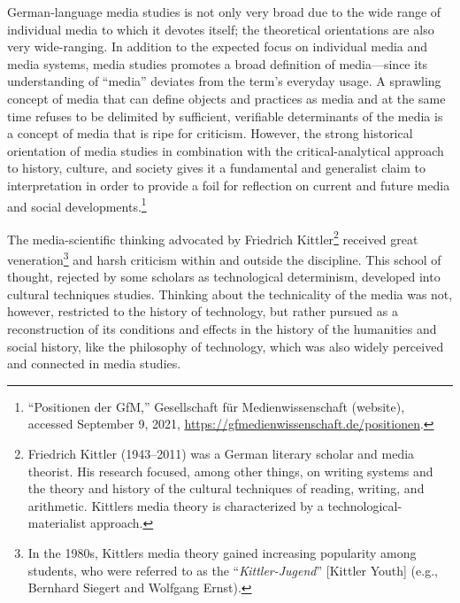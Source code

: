 \documentclass{tufte-handout}
\begin{document}
German-language media studies is not only very broad due to the wide
range of individual media to which it devotes itself; the theoretical
orientations are also very wide-ranging. In addition to the expected
focus on individual media and media systems, media studies promotes a
broad definition of media---since its understanding of ``media''
deviates from the term's everyday usage. A sprawling concept of media
that can define objects and practices as media and at the same time
refuses to be delimited by sufficient, verifiable determinants of the
media is a concept of media that is ripe for criticism. However, the
strong historical orientation of media studies in combination with the
critical-analytical approach to history, culture, and society gives it a
fundamental and generalist claim to interpretation in order to provide a
foil for reflection on current and future media and social
developments.\footnote{``Positionen der GfM,'' Gesellschaft für
  Medienwissenschaft (website), accessed September 9, 2021,
  \url{https://gfmedienwissenschaft.de/positionen}.}

The media-scientific thinking advocated by Friedrich Kittler\footnote{Friedrich
  Kittler (1943--2011) was a German literary scholar and media theorist.
  His research focused, among other things, on writing systems and the
  theory and history of the cultural techniques of reading, writing, and
  arithmetic. Kittler\textquotesingle s media theory is characterized by
  a technological-materialist approach.} received great
veneration\footnote{In the 1980s, Kittler\textquotesingle s media theory
  gained increasing popularity among students, who were referred to as
  the ``\emph{Kittler-Jugend}'' {[}Kittler Youth{]} (e.g., Bernhard
  Siegert and Wolfgang Ernst).} and harsh criticism within and outside
the discipline. This school of thought, rejected by some scholars as
technological determinism, developed into cultural techniques studies.
Thinking about the technicality of the media was not, however,
restricted to the history of technology, but rather pursued as a
reconstruction of its conditions and effects in the history of the
humanities and social history, like the philosophy of technology, which
was also widely perceived and connected in media studies.
\end{document}
